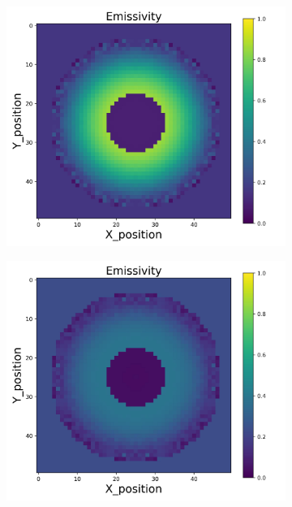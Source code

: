 \begin{figure}[p]
\begin{minipage}{\textwidth}
\begin{subfigure}{0.325\textwidth}
        \end{subfigure}
        \begin{subfigure}{0.325\textwidth}
            \centering
            \includegraphics[width=\textwidth]{figures/raw_data/23/exp/emi_cal.jpg}
        \end{subfigure}
        \begin{subfigure}{0.325\textwidth}
            \centering
            \includegraphics[width=\textwidth]{figures/raw_data/24/exp/emi_cal.jpg}

\end{subfigure}
\end{minipage}
\end{figure}

